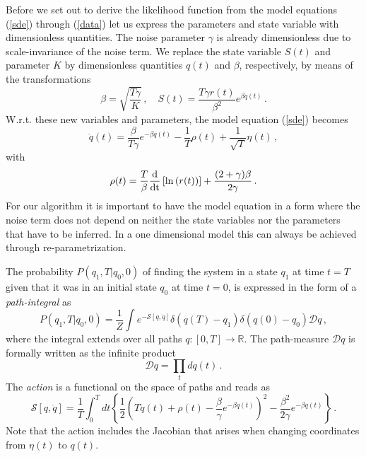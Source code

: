 \documentclass[12pt,a4paper,final]{iopart}
\newcommand{\dt}{\mathit{dt}}
\begin{document}
Before we set out to derive the likelihood function from the model equations (\ref{sde}) through (\ref{data}) let us express the parameters and state variable with dimensionless quantities.
The noise parameter $\gamma$ is already dimensionless due to scale-invariance of the noise term.
We replace the state variable $S(t)$ and parameter $K$ by dimensionless quantities $q(t)$ and $\beta$, respectively, by means of the transformations
\begin{equation}
  \beta=\sqrt{\frac{T\gamma}{K}}\,,\quad
  S(t)=\frac{T\gamma r(t)}{\beta^2}e^{\beta q(t)}\,.
\end{equation}
W.r.t. these new  variables and parameters, the model equation (\ref{sde}) becomes
\begin{equation}
  \dot q(t)
  =
  \frac{\beta}{T\gamma}e^{-\beta q(t)}
  -
  \frac{1}{T}\rho(t)
  +
  \frac{1}{\sqrt{T}}\eta(t)\,,
\end{equation}
with
\begin{equation}
  \rho(t)
  =
  \frac{T}{\beta}\frac{\mbox d}{\mbox{dt}}\left[ \ln \left( r(t) \right) \right]
  +
  \frac{(2+\gamma)\beta}{2\gamma}\,.
\end{equation}
For our algorithm it is important to have the model equation in a form where the noise term does not depend on neither the state variables nor the parameters that have to be inferred. In a one dimensional model this can always be achieved through re-parametrization.

The probability $P(q_1,T|q_0,0)$ of finding the system in a state $q_1$ at time $t = T$ given that it was in an initial state $q_0$ at time $t = 0$, is expressed in the form of a {\em path-integral} as
\begin{equation}\label{pathint}
P(q_1,T|q_0,0)
=
\frac{1}{Z}
\int
e^{-{\mathcal S}[q,\dot q]}
\delta(q(T)-q_1)
\delta(q(0)-q_0)
\mathcal{D}q \,,
\end{equation}
where the integral extends over all paths $q:[0,T]\rightarrow \mathbb R$.
The path-measure $\mathcal Dq$ is formally written as the infinite product
\begin{equation}\label{pathmeasure_q}
{\mathcal Dq}
=
\prod_{t}
dq(t)\,.
\end{equation}
The {\em action} is a functional on the space of paths and reads as \cite{lau_2007}
\begin{equation}\label{action1}
{\mathcal S}[{q},\dot q]
=
\frac{1}{T}
\int_0^T \dt \left\{
\frac{1}{2}
\left(
    T\dot q(t)
    +
    \rho(t)
    -
    \frac{\beta}{\gamma}e^{-\beta q(t)}\right)^2
    -
    \frac{\beta^2}{2\gamma}e^{-\beta q(t)}
\right\} \,.
\end{equation}
Note that the action includes the Jacobian that arises when changing coordinates from ${\eta(t)}$ to $q(t)$.
\end{document}
